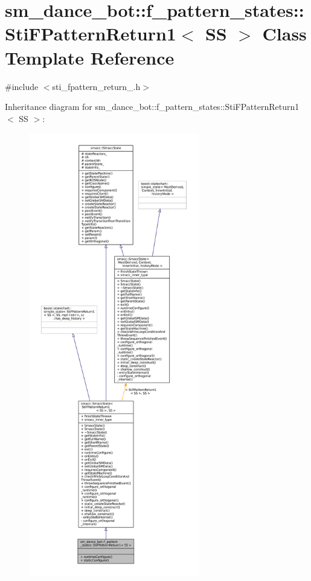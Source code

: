 \hypertarget{structsm__dance__bot_1_1f__pattern__states_1_1StiFPatternReturn1}{}\section{sm\+\_\+dance\+\_\+bot\+:\+:f\+\_\+pattern\+\_\+states\+:\+:Sti\+F\+Pattern\+Return1$<$ SS $>$ Class Template Reference}
\label{structsm__dance__bot_1_1f__pattern__states_1_1StiFPatternReturn1}


{\ttfamily \#include $<$sti\+\_\+fpattern\+\_\+return\+\_.\+h$>$}



Inheritance diagram for sm\+\_\+dance\+\_\+bot\+:\+:f\+\_\+pattern\+\_\+states\+:\+:Sti\+F\+Pattern\+Return1$<$ SS $>$\+:
\nopagebreak
\begin{figure}[H]
\begin{center}
\leavevmode
\includegraphics[height=550pt]{structsm__dance__bot_1_1f__pattern__states_1_1StiFPatternReturn1__inherit__graph}
\end{center}
\end{figure}



